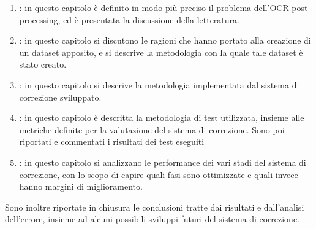 \begin{enumerate}
\item \textbf{}: in questo capitolo è definito in modo più preciso il problema dell'OCR post-processing, ed è presentata la discussione della letteratura.

\item \textbf{}: in questo capitolo si discutono le ragioni che hanno portato alla creazione di un dataset apposito, e si descrive la metodologia con la quale tale dataset è stato creato.

\item \textbf{}: in questo capitolo si descrive la metodologia implementata dal sistema di correzione sviluppato.


\item \textbf{}: in questo capitolo è descritta la metodologia di test utilizzata, insieme alle metriche definite per la valutazione del sistema di correzione. Sono poi riportati e commentati i risultati dei test eseguiti


\item \textbf{}: in questo capitolo si analizzano le performance dei vari stadi del sistema di correzione, con lo scopo di capire quali fasi sono ottimizzate e quali invece hanno margini di miglioramento.
\end{enumerate}
\noindent
Sono inoltre riportate in chiusura le conclusioni tratte dai risultati e dall'analisi dell'errore, insieme ad alcuni possibili sviluppi futuri del sistema di correzione.








